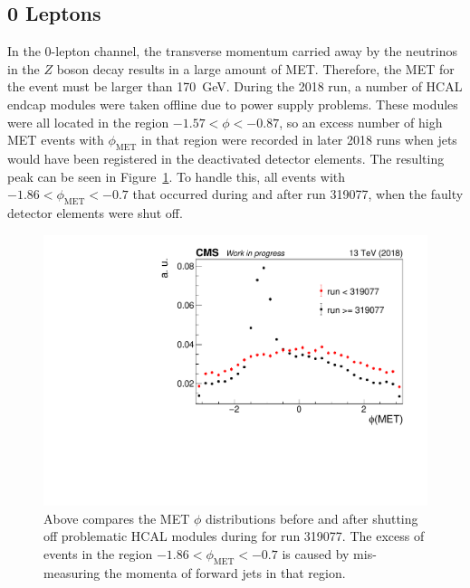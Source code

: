 \subsection{0 Leptons} \label{sec:resolved-0}

In the 0-lepton channel, the transverse momentum carried away by the neutrinos
in the $Z$ boson decay results in a large amount of MET.
Therefore, the MET for the event must be larger than \SI{170}{GeV}.
During the 2018 run, a number of HCAL endcap modules were taken offline
due to power supply problems.
These modules were all located in the region $-1.57 < \phi < -0.87$,
so an excess number of high MET events with $\phi_\mathrm{MET}$ in that region were recorded
in later 2018 runs when jets would have been registered in the deactivated detector elements.
The resulting peak can be seen in Figure~\ref{fig:met-peak}.
To handle this, all events with $-1.86 < \phi_\mathrm{MET} < -0.7$ that occurred
during and after run 319077, when the faulty detector elements were shut off.
\begin{figure}
  \centering
  \includegraphics[width=0.8\linewidth]{figures/METPhi319077.pdf}
  \caption[MET $\phi$ distribution before and after shutting off HCAL modules]{
    Above compares the MET $\phi$ distributions before and after shutting off
    problematic HCAL modules during for run 319077.
    The excess of events in the region $-1.86 < \phi_\mathrm{MET} < -0.7$
    is caused by mis-measuring the momenta of forward jets in that region.
  }
  \label{fig:met-peak}
\end{figure}

